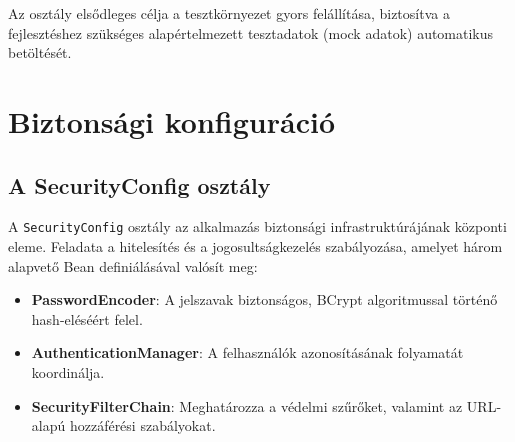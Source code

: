 Az osztály elsődleges célja a tesztkörnyezet gyors felállítása, biztosítva a fejlesztéshez szükséges alapértelmezett tesztadatok (mock adatok) automatikus betöltését.

\section{Biztonsági konfiguráció}

\subsection{A SecurityConfig osztály}
A \texttt{SecurityConfig} osztály az alkalmazás biztonsági infrastruktúrájának központi eleme. Feladata a hitelesítés és a jogosultságkezelés szabályozása, amelyet három alapvető Bean definiálásával valósít meg:

\begin{itemize}
\item \textbf{PasswordEncoder}: A jelszavak biztonságos, BCrypt algoritmussal történő hash-eléséért felel.
\item \textbf{AuthenticationManager}: A felhasználók azonosításának folyamatát koordinálja.
\item \textbf{SecurityFilterChain}: Meghatározza a védelmi szűrőket, valamint az URL-alapú hozzáférési szabályokat.
\end{itemize}

